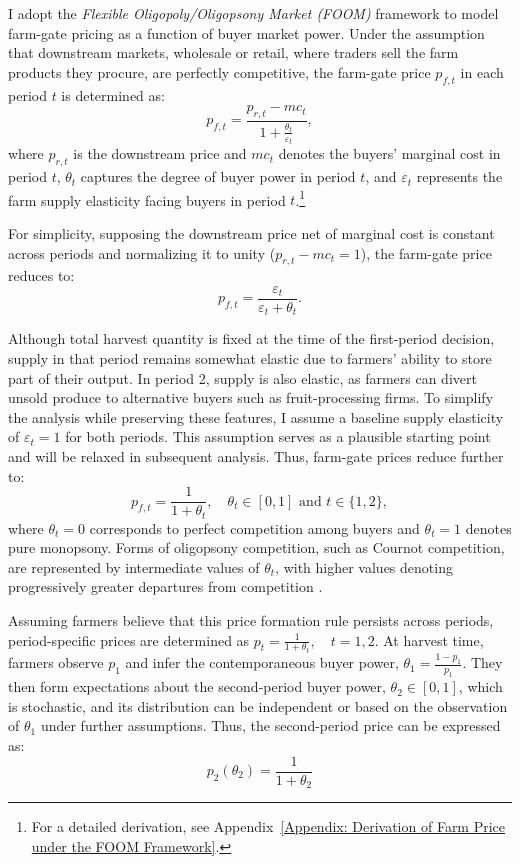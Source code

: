 I adopt the \textit{Flexible Oligopoly/Oligopsony Market (\textit{FOOM})} framework to model farm-gate pricing as a function of buyer market power. Under the assumption that downstream markets, wholesale or retail, where traders sell the farm products they procure, are perfectly competitive, the farm-gate price $p_{f,t}$ in each period $t$ is determined as:
\begin{equation}
p_{f,t} = \frac{p_{r,t} - mc_t}{1 + \frac{\theta_t}{\varepsilon_t}},
\end{equation}
where $p_{r,t}$ is the downstream price and $mc_t$ denotes the buyers' marginal cost in period $t$, $\theta_t$ captures the degree of buyer power in period $t$, and $\varepsilon_t$ represents the farm supply elasticity facing buyers in period $t$.\footnote{For a detailed derivation, see Appendix~\ref{Appendix: Derivation of Farm Price under the FOOM Framework}.}


For simplicity, supposing the downstream price net of marginal cost is constant across periods and normalizing it to unity ($p_{r,t} - mc_t = 1$), the farm-gate price reduces to:
\begin{equation}
p_{f,t} = \frac{\varepsilon_t}{\varepsilon_t + \theta_t}.
\end{equation}


Although total harvest quantity is fixed at the time of the first-period decision, supply in that period remains somewhat elastic due to farmers' ability to store part of their output. In period 2, supply is also elastic, as farmers can divert unsold produce to alternative buyers such as fruit-processing firms. To simplify the analysis while preserving these features, I assume a baseline supply elasticity of $\varepsilon_t = 1$ for both periods. This assumption serves as a plausible starting point and will be relaxed in subsequent analysis. Thus, farm-gate prices reduce further to:
\begin{equation}
p_{f,t} = \frac{1}{1+\theta_t}, \quad \theta_t \in [0,1] \text{ and } t \in \{1,2\},
\label{Eq: price formation by buyer power}
\end{equation}
where $\theta_t=0$ corresponds to perfect competition among buyers and $\theta_t=1$ denotes pure monopsony. Forms of oligopsony competition, such as Cournot competition, are represented by intermediate values of $\theta_t$, with higher values denoting progressively greater departures from competition \citep{karp1996dynamic,sexton2001assessment, saitone2009flexible, hamilton2021joint}.

Assuming farmers believe that this price formation rule persists across periods, period-specific prices are determined as $p_t = \frac{1}{1+\theta_t}, \quad t=1,2$. At harvest time, farmers observe $p_1$ and infer the contemporaneous buyer power, $\theta_1 = \frac{1 - p_1}{p_1}$. They then form expectations about the second-period buyer power, $\theta_2 \in [0,1]$, which is stochastic, and its distribution can be independent or based on the observation of $\theta_1$ under further assumptions. Thus, the second-period price can be expressed as:
\begin{equation}
p_2(\theta_2) = \frac{1}{1+\theta_2} 
\label{Eq: p_2 of buyer power change}
\end{equation}


